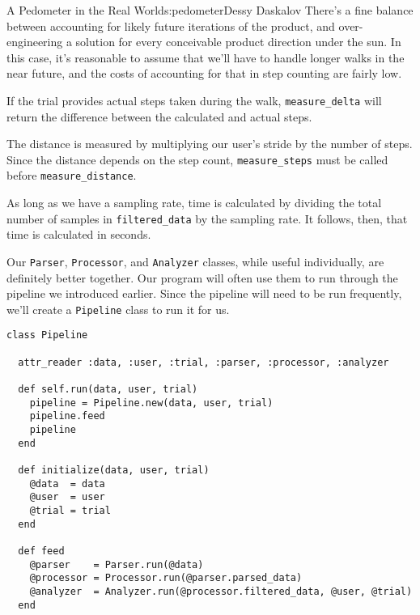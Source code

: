 \begin{aosachapter}{A Pedometer in the Real World}{s:pedometer}{Dessy Daskalov}
There's a fine balance between accounting for likely future iterations
of the product, and over-engineering a solution for every conceivable
product direction under the sun. In this case, it's reasonable to assume
that we'll have to handle longer walks in the near future, and the costs
of accounting for that in step counting are fairly low.

\label{measureux5fdelta}

If the trial provides actual steps taken during the walk,
\texttt{measure\_delta} will return the difference between the
calculated and actual steps.

\label{measureux5fdistance}

The distance is measured by multiplying our user's stride by the number
of steps. Since the distance depends on the step count,
\texttt{measure\_steps} must be called before
\texttt{measure\_distance}.

\label{measureux5ftime}

As long as we have a sampling rate, time is calculated by dividing the
total number of samples in \texttt{filtered\_data} by the sampling rate.
It follows, then, that time is calculated in seconds.

\label{tying-it-all-together-with-the-pipeline}

Our \texttt{Parser}, \texttt{Processor}, and \texttt{Analyzer} classes,
while useful individually, are definitely better together. Our program
will often use them to run through the pipeline we introduced earlier.
Since the pipeline will need to be run frequently, we'll create a
\texttt{Pipeline} class to run it for us.

\begin{verbatim}
class Pipeline

  attr_reader :data, :user, :trial, :parser, :processor, :analyzer

  def self.run(data, user, trial)
    pipeline = Pipeline.new(data, user, trial)
    pipeline.feed
    pipeline
  end

  def initialize(data, user, trial)
    @data  = data
    @user  = user
    @trial = trial
  end

  def feed
    @parser    = Parser.run(@data)
    @processor = Processor.run(@parser.parsed_data)
    @analyzer  = Analyzer.run(@processor.filtered_data, @user, @trial)
  end


\end{verbatim}
\end{aosachapter}
